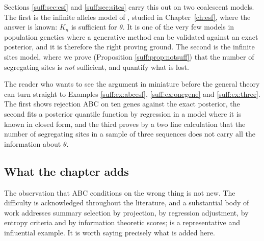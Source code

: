 Sections \ref{suff:sec:esf} and \ref{suff:sec:sites} carry this out on two coalescent
models. The first is the infinite alleles model of \citet{suff:ewens1972}, studied in
Chapter~\ref{ch:esf}, where the answer is known: $K_n$ is sufficient for $\theta$. It is one
of the very few models in population genetics where a generative method can be validated
against an exact posterior, and it is therefore the right proving ground. The second is the
infinite sites model, where we prove (Proposition \ref{suff:prop:notsuff}) that the number
of segregating sites is \emph{not} sufficient, and quantify what is lost.

The reader who wants to see the argument in miniature before the general theory can turn
straight to Examples \ref{suff:ex:abcesf}, \ref{suff:ex:onegene} and \ref{suff:ex:three}.
The first shows rejection ABC on ten genes against the exact posterior, the second fits a
posterior quantile function by regression in a model where it is known in closed form, and
the third proves by a two line calculation that the number of segregating sites in a sample
of three sequences does not carry all the information about $\theta$.

\subsection{What the chapter adds}
\label{suff:sec:contrib}

The observation that ABC conditions on the wrong thing is not new. The difficulty is
acknowledged throughout the literature, and a substantial body of work addresses summary
selection by projection, by regression adjustment, by entropy criteria and by information
theoretic scores; \citet{suff:fearnheadprangle2012} is a representative and influential
example. It is worth saying precisely what is added here.

